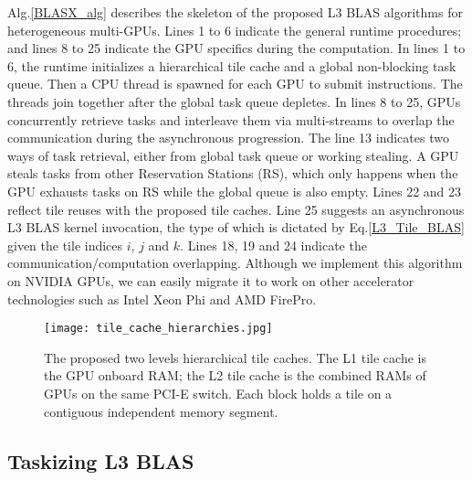 \documentclass[conference]{IEEEtran}
\begin{document}
Alg.\ref{BLASX_alg} describes the skeleton of the proposed L3 BLAS algorithms for heterogeneous 
multi-GPUs. Lines 1 to 6 indicate the general runtime procedures; and 
lines 8 to 25 indicate the GPU specifics during the computation. In lines 1 to 6, the runtime 
initializes a hierarchical tile cache and a global non-blocking task queue. Then 
a CPU thread is spawned for each GPU to submit instructions. The threads join together 
after the global task queue depletes. In lines 8 to 25, GPUs concurrently retrieve tasks
and interleave them via multi-streams to overlap the communication during the asynchronous progression. 
The line 13 indicates two ways of task retrieval, either from global task queue or working stealing.
A GPU steals tasks from other Reservation Stations (RS), which only happens when the GPU 
exhausts tasks on RS while the global queue is also empty. Lines 22 and 23 reflect tile reuses with 
the proposed tile caches. Line 25 suggests an asynchronous L3 BLAS kernel invocation, 
the type of which is dictated by Eq.\ref{L3_Tile_BLAS} given the tile indices $i$, 
$j$ and $k$. Lines 18, 19 and 24 indicate the communication/computation overlapping.
Although we implement this algorithm on NVIDIA GPUs, we can easily migrate it to work on 
other accelerator technologies such as Intel Xeon Phi and AMD FirePro.

\begin{figure}[!t]
\centering
\texttt{[image: tile\_cache\_hierarchies.jpg]}
\caption{The proposed two levels hierarchical tile caches. The L1 tile cache is the GPU onboard RAM; 
the L2 tile cache is the combined RAMs of GPUs on the same PCI-E switch. Each block holds a 
tile on a contiguous independent memory segment.}
\label{tile_caching}
\vspace{-0.25in}
\end{figure}

\vspace{-0.12in}
\subsection{Taskizing L3 BLAS}
\vspace{-0.05in}
\end{document}
